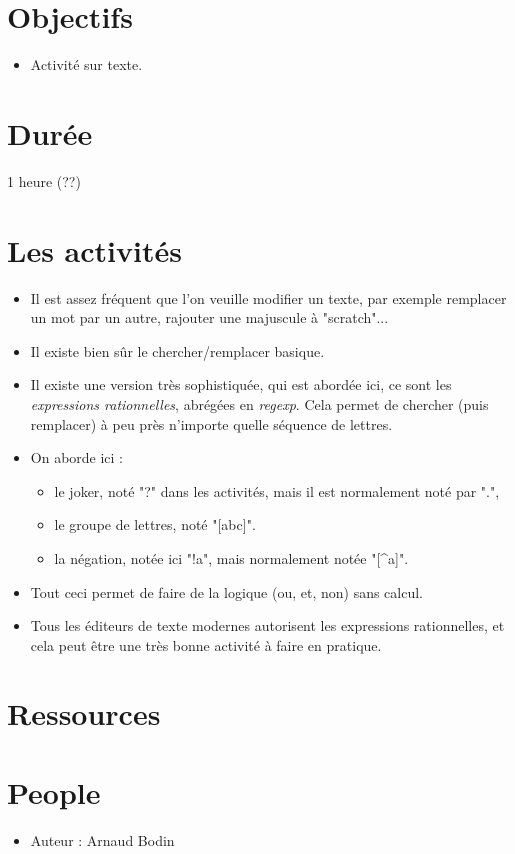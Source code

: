 \documentclass[class=report,crop=false, 12pt]{standalone}
\begin{document}



\section*{Objectifs}

\begin{itemize}
  \item Activité sur texte.
\end{itemize}


\section*{Durée}

1 heure (??)

\section*{Les activités}

\begin{itemize}
  \item Il est assez fréquent que l'on veuille modifier un texte, par exemple remplacer un mot par un autre, rajouter une majuscule à "scratch"...
  
  \item Il existe bien sûr le chercher/remplacer basique.
  
  \item Il existe une version très sophistiquée, qui est abordée ici, ce sont les \emph{expressions rationnelles}, abrégées en \emph{regexp}. Cela permet de chercher (puis remplacer) à peu près n'importe quelle séquence de lettres.
  
  \item On aborde ici :
  \begin{itemize}
    \item le joker, noté "?" dans les activités, mais il est normalement noté par ".",
    \item le groupe de lettres, noté "[abc]".
    \item la négation, notée ici "!a", mais normalement notée "[\^{}a]".
  \end{itemize}
  
  \item Tout ceci permet de faire de la logique (ou, et, non) sans calcul.
  
  \item Tous les éditeurs de texte modernes autorisent les expressions rationnelles, et cela peut être une très bonne activité à faire en pratique.
\end{itemize}


\section*{Ressources}


\section*{People}

\begin{itemize}
  \item Auteur : Arnaud Bodin
\end{itemize}
\end{document}
